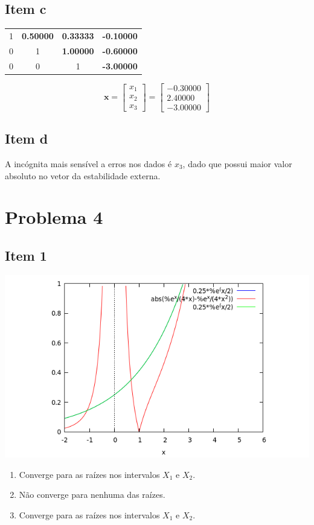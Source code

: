 {\subsection{Item c}
\begin{center}
    \begin{tabular}{ c c c | c}
        1 & \textbf{0.50000} & \textbf{0.33333} & \textbf{-0.10000} \\
        0 & 1 & \textbf{1.00000} & \textbf{-0.60000} \\
        0 & 0 & 1 & \textbf{-3.00000}
    \end{tabular}
\end{center}
\begin{equation*}
    \mathbf{x}
    =\begin{bmatrix} x_1 \\ x_2 \\ x_3 \end{bmatrix}
    =\begin{bmatrix} -0.30000 \\ 2.40000 \\ -3.00000 \end{bmatrix}
\end{equation*}
\subsection{Item d}
A incógnita mais sensível a erros nos dados é $x_3$, dado que possui maior valor absoluto no vetor da estabilidade externa.

}
\section{Problema 4}
\subsection{Item 1}

\begin{center} \includegraphics[scale=0.45]{2015E_4} \end{center}
\begin{enumerate}[label=\alph*)]
    \item Converge para as raízes nos intervalos $X_1$ e $X_2$.
    \item Não converge para nenhuma das raízes.
    \item Converge para as raízes nos intervalos $X_1$ e $X_2$.
\end{enumerate}
